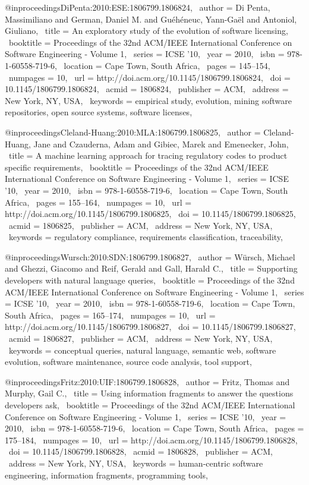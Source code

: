 @inproceedings{DiPenta:2010:ESE:1806799.1806824,
 author = {Di Penta, Massimiliano and German, Daniel M. and Gu{\'e}h{\'e}neuc, Yann-Ga\"{e}l and Antoniol, Giuliano},
 title = {An exploratory study of the evolution of software licensing},
 booktitle = {Proceedings of the 32nd ACM/IEEE International Conference on Software Engineering - Volume 1},
 series = {ICSE '10},
 year = {2010},
 isbn = {978-1-60558-719-6},
 location = {Cape Town, South Africa},
 pages = {145--154},
 numpages = {10},
 url = {http://doi.acm.org/10.1145/1806799.1806824},
 doi = {10.1145/1806799.1806824},
 acmid = {1806824},
 publisher = {ACM},
 address = {New York, NY, USA},
 keywords = {empirical study, evolution, mining software repositories, open source systems, software licenses},
} 

@inproceedings{Cleland-Huang:2010:MLA:1806799.1806825,
 author = {Cleland-Huang, Jane and Czauderna, Adam and Gibiec, Marek and Emenecker, John},
 title = {A machine learning approach for tracing regulatory codes to product specific requirements},
 booktitle = {Proceedings of the 32nd ACM/IEEE International Conference on Software Engineering - Volume 1},
 series = {ICSE '10},
 year = {2010},
 isbn = {978-1-60558-719-6},
 location = {Cape Town, South Africa},
 pages = {155--164},
 numpages = {10},
 url = {http://doi.acm.org/10.1145/1806799.1806825},
 doi = {10.1145/1806799.1806825},
 acmid = {1806825},
 publisher = {ACM},
 address = {New York, NY, USA},
 keywords = {regulatory compliance, requirements classification, traceability},
} 

@inproceedings{Wursch:2010:SDN:1806799.1806827,
 author = {W\"{u}rsch, Michael and Ghezzi, Giacomo and Reif, Gerald and Gall, Harald C.},
 title = {Supporting developers with natural language queries},
 booktitle = {Proceedings of the 32nd ACM/IEEE International Conference on Software Engineering - Volume 1},
 series = {ICSE '10},
 year = {2010},
 isbn = {978-1-60558-719-6},
 location = {Cape Town, South Africa},
 pages = {165--174},
 numpages = {10},
 url = {http://doi.acm.org/10.1145/1806799.1806827},
 doi = {10.1145/1806799.1806827},
 acmid = {1806827},
 publisher = {ACM},
 address = {New York, NY, USA},
 keywords = {conceptual queries, natural language, semantic web, software evolution, software maintenance, source code analysis, tool support},
} 

@inproceedings{Fritz:2010:UIF:1806799.1806828,
 author = {Fritz, Thomas and Murphy, Gail C.},
 title = {Using information fragments to answer the questions developers ask},
 booktitle = {Proceedings of the 32nd ACM/IEEE International Conference on Software Engineering - Volume 1},
 series = {ICSE '10},
 year = {2010},
 isbn = {978-1-60558-719-6},
 location = {Cape Town, South Africa},
 pages = {175--184},
 numpages = {10},
 url = {http://doi.acm.org/10.1145/1806799.1806828},
 doi = {10.1145/1806799.1806828},
 acmid = {1806828},
 publisher = {ACM},
 address = {New York, NY, USA},
 keywords = {human-centric software engineering, information fragments, programming tools},
} 

